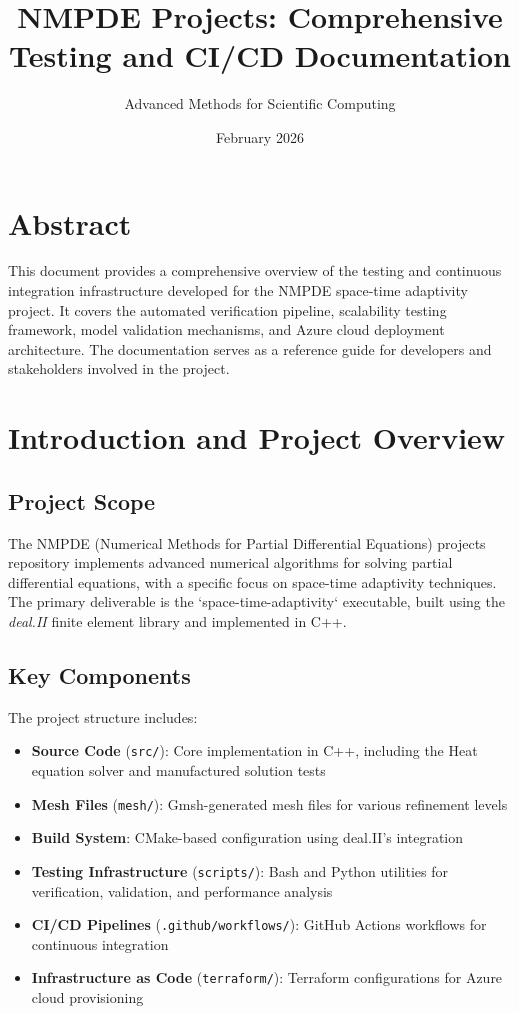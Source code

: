 \documentclass[11pt,a4paper]{article}
\title{\textbf{NMPDE Projects: Comprehensive Testing and CI/CD Documentation}}
\author{Advanced Methods for Scientific Computing}
\date{February 2026}
\begin{document}
\maketitle

\section*{Abstract}
This document provides a comprehensive overview of the testing and continuous integration infrastructure developed for the NMPDE space-time adaptivity project. It covers the automated verification pipeline, scalability testing framework, model validation mechanisms, and Azure cloud deployment architecture. The documentation serves as a reference guide for developers and stakeholders involved in the project.

\newpage
\tableofcontents

\newpage

\section{Introduction and Project Overview}

\subsection{Project Scope}
The NMPDE (Numerical Methods for Partial Differential Equations) projects repository implements advanced numerical algorithms for solving partial differential equations, with a specific focus on space-time adaptivity techniques. The primary deliverable is the `space-time-adaptivity` executable, built using the \textit{deal.II} finite element library and implemented in C++.

\subsection{Key Components}
The project structure includes:
\begin{itemize}
    \item \textbf{Source Code} (\texttt{src/}): Core implementation in C++, including the Heat equation solver and manufactured solution tests
    \item \textbf{Mesh Files} (\texttt{mesh/}): Gmsh-generated mesh files for various refinement levels
    \item \textbf{Build System}: CMake-based configuration using deal.II's integration
    \item \textbf{Testing Infrastructure} (\texttt{scripts/}): Bash and Python utilities for verification, validation, and performance analysis
    \item \textbf{CI/CD Pipelines} (\texttt{.github/workflows/}): GitHub Actions workflows for continuous integration
    \item \textbf{Infrastructure as Code} (\texttt{terraform/}): Terraform configurations for Azure cloud provisioning
\end{itemize}
\end{document}
